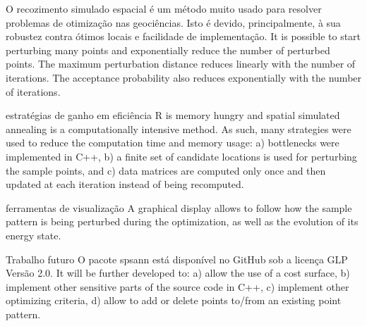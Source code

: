 O recozimento simulado espacial é um método muito usado para resolver problemas de otimização nas geociências. Isto é devido, principalmente, à sua robustez contra ótimos locais e facilidade de implementação.
It is possible to start perturbing many points and exponentially reduce the number of perturbed points. The maximum perturbation distance reduces linearly with the number of iterations. The acceptance probability also reduces exponentially with the number of iterations.

estratégias de ganho em eficiência
R is memory hungry and spatial simulated annealing is a computationally intensive method. As such, many strategies were used to reduce the computation time and memory usage: a) bottlenecks were implemented in C++, b) a finite set of candidate locations is used for perturbing the sample points, and c) data matrices are computed only once and then updated at each iteration instead of being recomputed.

ferramentas de visualização
A graphical display allows to follow how the sample pattern is being perturbed during the optimization, as well as the evolution of its energy state. 

Trabalho futuro
O pacote spsann está disponível no GitHub sob a licença  GLP Versão 2.0. It will be further developed to: a) allow the use of a cost surface, b) implement other sensitive parts of the source code in C++, c) implement other optimizing criteria, d) allow to add or delete points to/from an existing point pattern.